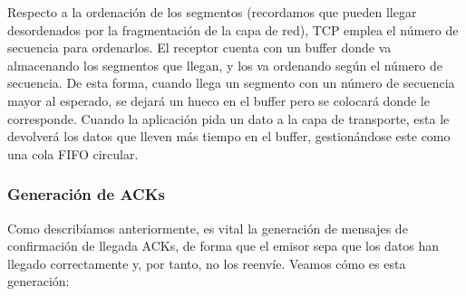 Respecto a la ordenación de los segmentos (recordamos que pueden llegar desordenados por la fragmentación de la capa de red), \acrshort{TCP} emplea el número de secuencia para ordenarlos. El receptor cuenta con un buffer donde va almacenando los segmentos que llegan, y los va ordenando según el número de secuencia. De esta forma, cuando llega un segmento con un número de secuencia mayor al esperado, se dejará un hueco en el buffer pero se colocará donde le corresponde. Cuando la aplicación pida un dato a la capa de transporte, esta le devolverá los datos que lleven más tiempo en el buffer, gestionándose este como una cola \acrshort{FIFO} circular.

\subsubsection{Generación de ACKs}

Como describíamos anteriormente, es vital la generación de mensajes de confirmación de llegada \acrshort{ACK}s, de forma que el emisor sepa que los datos han llegado correctamente y, por tanto, no los reenvíe. Veamos cómo es esta generación:

